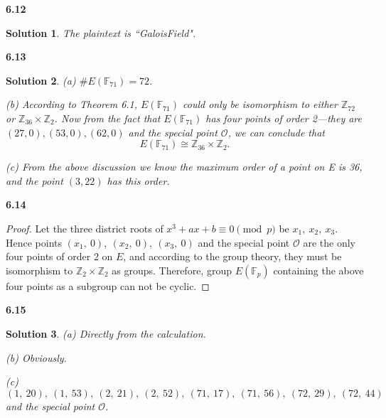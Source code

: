 \documentclass[12pt,a4paper]{article}
\theoremstyle{solution}
\newtheorem*{sol}{Solution}
\begin{document}
\textbf{6.12}

\begin{sol}
The plaintext is ``GaloisField".
\end{sol}

\textbf{6.13}

\begin{sol}
(a) $\#E(\mathbb{F}_{71})=72$.


(b) According to Theorem 6.1, $E(\mathbb{F}_{71})$ could only be isomorphism to either $\mathbb{Z}_{72}$ or $\mathbb{Z}_{36} \times \mathbb{Z}_2$. Now from the fact that $E(\mathbb{F}_{71})$ has four points of order 2---they are $(27, 0), (53, 0), (62, 0)$ and the special point $\mathcal{O}$, we can conclude that
$$E(\mathbb{F}_{71}) \cong \mathbb{Z}_{36} \times \mathbb{Z}_2.$$

(c) From the above discussion we know the maximum order of a point on E is 36, and the point $(3, 22)$ has this order.
\end{sol}

\textbf{6.14}

\begin{proof}
Let the three district roots of $x^3+ax+b\equiv 0 \pmod{p}$ be $x_1,~x_2,~x_3$. Hence points $(x_1,~0),~(x_2,~0),~(x_3,~0)$ and the special point $\mathcal{O}$ are the only four points of order 2 on $E$, and according to the group theory, they must be isomorphism to $\mathbb{Z}_2 \times \mathbb{Z}_2$ as groups. Therefore, group $E(\mathbb{F}_p)$ containing the above four points as a subgroup can not be cyclic.
 \end{proof}

\textbf{6.15}

\begin{sol}
(a) Directly from the calculation.

(b) Obviously.

(c) $(1,~20),~(1,~53),~(2,~21),~(2,~52),~(71,~17),~(71,~56),~(72,~29),~(72,~44)$ and the special point $\mathcal{O}$.
\end{sol}
\end{document}
